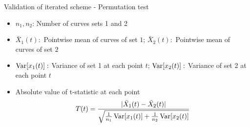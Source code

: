\documentclass[final]{beamer}
\newlength{\onecolwid}
\begin{document}
\begin{frame}{}
\begin{columns}[t]
\begin{column}{\onecolwid}
\begin{block}{Validation of iterated scheme - Permutation test}
        \begin{itemize}
        \item $n_1, n_2$: Number of curves sets 1 and 2
        \item $\bar{X}_1(t): $ Pointwise mean of curves of set $1$; $\bar{X}_2(t): $ Pointwise mean of curves of set $2$
        \item $\operatorname{Var}[x_1(t)]: $ Variance of set 1 at each point $t$; $\operatorname{Var}[x_2(t)]: $ Variance of set 2 at each point $t$ 
        \item Absolute value of t-statistic at each point 
          $$T(t) = \frac{|\bar{X}_1(t) - \bar{X}_2(t)|}{\sqrt{\frac{1}{n_1}\operatorname{Var}[x_1(t)] + 
            \frac{1}{n_2}\operatorname{Var}[x_2(t)]}}$$ 
        \end{itemize}
      \end{block}
    \end{column}


\end{columns}
\end{frame}
\end{document}
